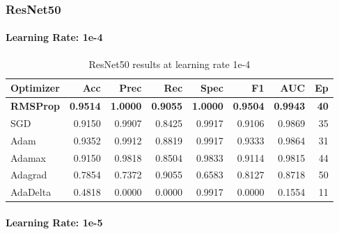 \subsubsection{ResNet50}
\label{appx:resnet50}

\paragraph{Learning Rate: 1e-4}

\begingroup
\tiny
\setlength{\tabcolsep}{2.5pt}
\begin{table}[H]
  \centering
  \caption{ResNet50 results at learning rate 1e-4}
  \label{tab:resnet50-1e4}
  \begin{tabular}{l r r r r r r r}
    \toprule
    \rowcolor{tableheader}
    \textbf{Optimizer} & \textbf{Acc} & \textbf{Prec} & \textbf{Rec} &
    \textbf{Spec} & \textbf{F1} & \textbf{AUC} & \textbf{Ep} \\
    \midrule
    \textbf{RMSProp}  & \textbf{0.9514} & \textbf{1.0000} & \textbf{0.9055} & \textbf{1.0000} & \textbf{0.9504} & \textbf{0.9943} & \textbf{40} \\
    SGD      & 0.9150 & 0.9907 & 0.8425 & 0.9917 & 0.9106 & 0.9869 & 35 \\
    Adam     & 0.9352 & 0.9912 & 0.8819 & 0.9917 & 0.9333 & 0.9864 & 31 \\
    Adamax   & 0.9150 & 0.9818 & 0.8504 & 0.9833 & 0.9114 & 0.9815 & 44 \\
    Adagrad  & 0.7854 & 0.7372 & 0.9055 & 0.6583 & 0.8127 & 0.8718 & 50 \\
    AdaDelta & 0.4818 & 0.0000 & 0.0000 & 0.9917 & 0.0000 & 0.1554 & 11 \\
    \bottomrule
  \end{tabular}
\end{table}
\endgroup

\paragraph{Learning Rate: 1e-5}

